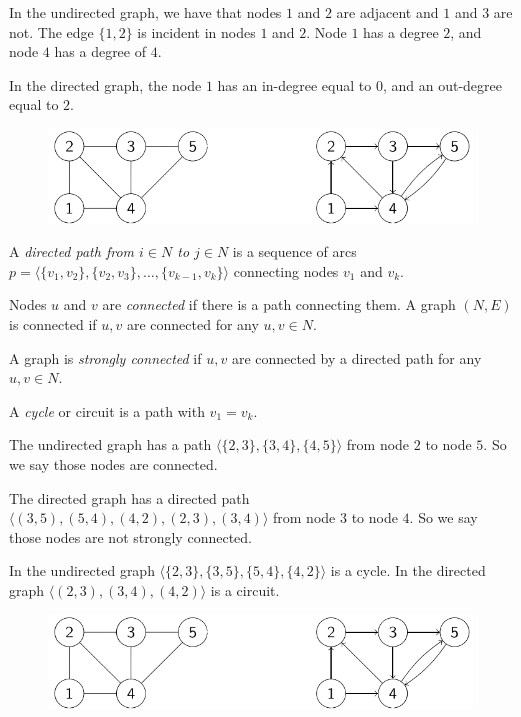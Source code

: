 \documentclass[12pt, a4paper]{report}
\newtheorem[style=M,bodystyle=\normalfont]{proposition}{Proposition}
\newtheorem[style=M,bodystyle=\normalfont]{theorem}{Theorem}
\newtheorem[style=M,bodystyle=\normalfont]{corollary}{Corollary}
\newtheorem[style=M,bodystyle=\normalfont]{lemma}{Lemma}
\newtheorem[style=M,bodystyle=\normalfont]{definition}{Definition}
\begin{document}
    \begin{example}

        In the undirected graph, we have that nodes $1$ and $2$ are adjacent and $1$ and $3$ are not. The edge $\{1,2\}$ is incident in nodes $1$ and $2$. Node $1$ has a degree $2$,
        and node $4$ has a degree of $4$. 

        In the directed graph, the node $1$ has an in-degree equal to $0$, and an out-degree equal to $2$.
        \begin{figure}[H]
            \centering
            \includegraphics[width=0.75\linewidth]{images/graph.png}
        \end{figure}
    \end{example}
    \begin{definition}
        A \emph{directed path from $i \in N$ to $j \in N$} is a sequence of arcs $p=\langle \{v_1,v_2\},\{v_2,v_3\},\dots,\{v_{k-1},v_k\}\rangle $ connecting nodes $v_1$ and $v_k$.

        Nodes $u$ and $v$ are \emph{connected} if there is a path connecting them. A graph $(N,E)$ is connected if $u,v$ are connected for any $u,v \in N$. 
        
        A graph is \emph{strongly connected} if $u,v$ are connected by a directed path for any $u,v \in N$. 
        
        A \emph{cycle} or circuit is a path with $v_1=v_k$.
    \end{definition}
    \begin{example}
        The undirected graph has a path $\langle \{2,3\},\{3,4\},\{4,5\}\rangle$ from node $2$ to node $5$. So we say those nodes are connected. 
        
        The directed graph has a directed path $\langle (3,5),(5,4),(4,2),(2,3),(3,4) \rangle$ from node $3$ to node $4$. So we say those nodes are not strongly connected. 
        
        In the undirected graph $\langle \{2,3\},\{3,5\},\{5,4\},\{4,2\}\rangle$ is a cycle. 
        In the directed graph $\langle (2,3),(3,4),(4,2) \rangle$ is a circuit. 
        \begin{figure}[H]
            \centering
            \includegraphics[width=0.75\linewidth]{images/graph.png}
        \end{figure}
    \end{example}
\end{document}
